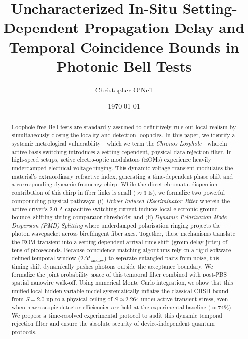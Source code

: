 \documentclass[aps,pra,reprint,superscriptaddress,amsmath,amssymb,floatfix]{revtex4-2}
\begin{document}
\title{Uncharacterized In-Situ Setting-Dependent Propagation Delay and Temporal Coincidence Bounds in Photonic Bell Tests}

\author{Christopher O'Neil}

\date{\today}

\begin{abstract}
Loophole-free Bell tests are standardly assumed to definitively rule out local realism by simultaneously closing the locality and detection loopholes. In this paper, we identify a systemic metrological vulnerability---which we term the \textit{Chronos Loophole}---wherein active basis switching introduces a setting-dependent, physical data-rejection filter. In high-speed setups, active electro-optic modulators (EOMs) experience heavily underdamped electrical voltage ringing. This dynamic voltage transient modulates the material's extraordinary refractive index, generating a time-dependent phase shift and a corresponding dynamic frequency chirp. While the direct chromatic dispersion contribution of this chirp in fiber links is small ($\approx 3\text{ fs}$), we formalize two powerful compounding physical pathways: (i) \textit{Driver-Induced Discriminator Jitter} wherein the active driver's $2.0\text{ A}$ capacitive switching current induces local electronic ground bounce, shifting timing comparator thresholds; and (ii) \textit{Dynamic Polarization Mode Dispersion (PMD) Splitting} where underdamped polarization ringing projects the photon wavepacket across birefringent fiber axes. Together, these mechanisms translate the EOM transient into a setting-dependent arrival-time shift (group delay jitter) of tens of picoseconds. Because coincidence-matching algorithms rely on a rigid software-defined temporal window ($2\Delta t_{\text{window}}$) to separate entangled pairs from noise, this timing shift dynamically pushes photons outside the acceptance boundary. We formalize the joint probability space of this temporal filter combined with post-PBS spatial nanowire walk-off. Using numerical Monte Carlo integration, we show that this unified local hidden variable model systematically inflates the classical CHSH bound from $S = 2.0$ up to a physical ceiling of $S \approx 2.264$ under active transient stress, even when macroscopic detector efficiencies are held at the experimental baseline ($\approx 74\%$). We propose a time-resolved experimental protocol to audit this dynamic temporal rejection filter and ensure the absolute security of device-independent quantum protocols.
\end{abstract}
\end{document}
